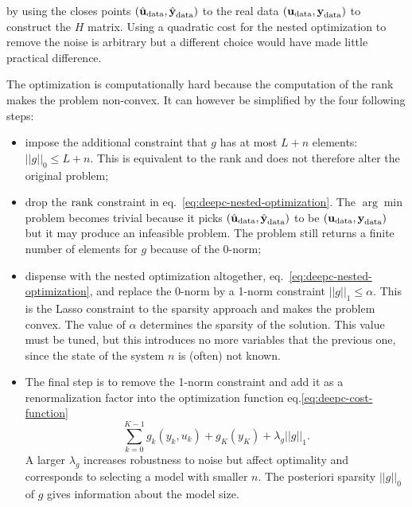 by using the closes points $(\hat{\boldsymbol{\mathrm{u}}}_\textrm{data},\hat{\boldsymbol{\mathrm{y}}}_\textrm{data})$ to the real data $(\boldsymbol{\mathrm{u}}_\textrm{data},\boldsymbol{\mathrm{y}}_\textrm{data})$ to construct the $H$ matrix. Using a quadratic cost for the nested optimization to remove the noise is arbitrary but a different choice would have made little practical difference.

The optimization is computationally hard because the computation of the rank makes the problem non-convex. It can however be simplified by the four following steps:
\begin{itemize}
\item impose the additional constraint that $g$ has at most $L+n$ elements: $||g||_0\le L+n$. This is equivalent to the rank and does not therefore alter the original problem;
\item drop the $\textrm{rank}$ constraint in eq.~\eqref{eq:deepc-nested-optimization}. The $\arg \min$ problem becomes trivial because it picks $(\hat{\boldsymbol{\mathrm{u}}}_\textrm{data},\hat{\boldsymbol{\mathrm{y}}}_\textrm{data})$ to be $(\boldsymbol{\mathrm{u}}_\textrm{data},\boldsymbol{\mathrm{y}}_\textrm{data})$ but it may produce an infeasible problem. The problem still returns a finite number of elements for $g$ because of the 0-norm;
\item dispense with the nested optimization altogether, eq.~\eqref{eq:deepc-nested-optimization}, and replace the 0-norm by a 1-norm constraint $||g||_1\le \alpha$. This is the Lasso constraint to the sparsity approach and makes the problem convex. The value of $\alpha$ determines the sparsity of the solution. This value must be tuned, but this introduces no more variables that the previous one, since the state of the system $n$ is (often) not known.
\item The final step is to remove the 1-norm constraint and add it as a renormalization factor into the optimization function eq.\eqref{eq:deepc-cost-function}
  \begin{equation*}
    \sum_{k=0}^{K-1} g_k(y_k,u_k) + g_K(y_K) + \lambda_g||g||_1.
  \end{equation*}
  A larger $\lambda_g$ increases robustness to noise but affect optimality and corresponds to selecting a model with smaller $n$. The posteriori sparsity $||g||_0$ of $g$ gives information about the model size.
\end{itemize}

